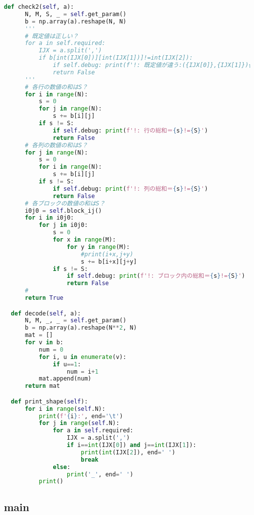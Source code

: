 \documentclass[uplatex,dvipdfmx,a4paper,11pt,oneside,openany]{jsbook}
\begin{document}
\begin{lstlisting}[language=Python]
  def check2(self, a):
      N, M, S, _ = self.get_param()
      b = np.array(a).reshape(N, N)
      '''
      # 既定値は正しい？
      for a in self.required:
          IJX = a.split(',')
          if b[int(IJX[0])][int(IJX[1])]!=int(IJX[2]):
              if self.debug: print(f'!: 既定値が違う:({IJX[0]},{IJX[1]}){IJX[2]}!={b[int(IJX[0])][int(IJX[1])]}')
              return False
      '''
      # 各行の数値の和はS？
      for i in range(N):
          s = 0
          for j in range(N):
              s += b[i][j]
          if s != S:
              if self.debug: print(f'!: 行の総和＝{s}!={S}')
              return False
      # 各列の数値の和はS？
      for j in range(N):
          s = 0
          for i in range(N):
              s += b[i][j]
          if s != S:
              if self.debug: print(f'!: 列の総和＝{s}!={S}')
              return False
      # 各ブロックの数値の和はS？
      i0j0 = self.block_ij()
      for i in i0j0:
          for j in i0j0:
              s = 0
              for x in range(M):
                  for y in range(M):
                      #print(i+x,j+y)
                      s += b[i+x][j+y]
              if s != S:
                  if self.debug: print(f'!: ブロック内の総和＝{s}!={S}')
                  return False
      #
      return True

  def decode(self, a):
      N, M, _, _ = self.get_param()
      b = np.array(a).reshape(N**2, N)
      mat = []
      for v in b:
          num = 0
          for i, u in enumerate(v):
              if u==1:
                  num = i+1
          mat.append(num)
      return mat

  def print_shape(self):
      for i in range(self.N):
          print(f'{i}:', end='\t')
          for j in range(self.N):
              for a in self.required:
                  IJX = a.split(',')
                  if i==int(IJX[0]) and j==int(IJX[1]):
                      print(int(IJX[2]), end=' ')
                      break
              else:
                  print('_', end=' ')
          print()
\end{lstlisting}

\subsection{main}
\end{document}
